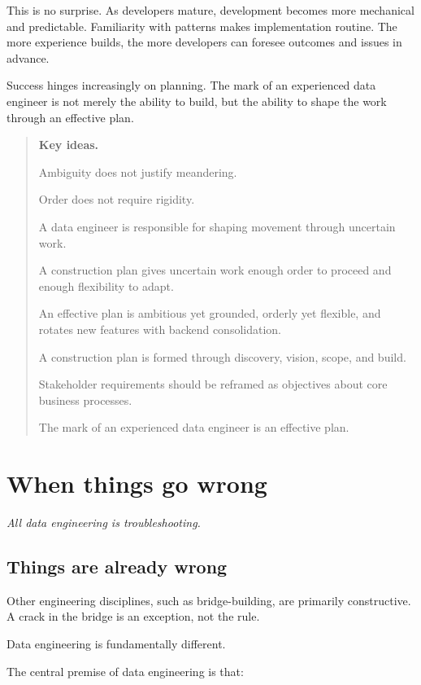 \documentclass[10pt,openany,10pt]{book}
\begin{document}
This is no surprise. As developers mature, development becomes more
mechanical and predictable. Familiarity with patterns makes
implementation routine. The more experience builds, the more developers
can foresee outcomes and issues in advance.

Success hinges increasingly on planning. The mark of an experienced data
engineer is not merely the ability to build, but the ability to shape
the work through an effective plan.

\begin{quote}
\textbf{Key ideas.}

Ambiguity does not justify meandering.

Order does not require rigidity.

A data engineer is responsible for shaping movement through uncertain
work.

A construction plan gives uncertain work enough order to proceed and
enough flexibility to adapt.

An effective plan is ambitious yet grounded, orderly yet flexible, and
rotates new features with backend consolidation.

A construction plan is formed through discovery, vision, scope, and
build.

Stakeholder requirements should be reframed as objectives about core
business processes.

The mark of an experienced data engineer is an effective plan.
\end{quote}

\newpage

\chapter{When things go
wrong}\label{docs-judgement-under-ambiguity-when-things-go-wrong}

\emph{All data engineering is troubleshooting.}

\section{Things are already wrong}\label{things-are-already-wrong}

Other engineering disciplines, such as bridge-building, are primarily
constructive. A crack in the bridge is an exception, not the rule.

Data engineering is fundamentally different.

The central premise of data engineering is that:
\end{document}
